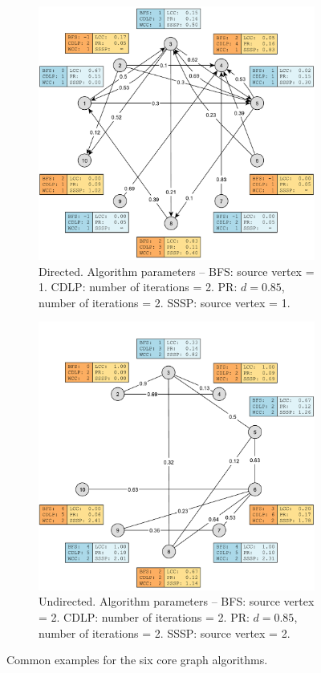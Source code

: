\begin{figure}[h]
	\centering
	\begin{subfigure}{\textwidth}
		\centering
		\includegraphics[scale=\examplescale]{figures/examples/common-dir.pdf}
		\caption{Directed. Algorithm parameters --
			BFS: source vertex = 1.
			CDLP: number of iterations = 2.
			PR: $d = 0.85$, number of iterations = 2.
			SSSP: source vertex = 1.}
	\end{subfigure}
	\begin{subfigure}{\textwidth}
		\centering
		\includegraphics[scale=\examplescale]{figures/examples/common-undir.pdf}
		\caption{Undirected. Algorithm parameters --
			BFS: source vertex = 2.
			CDLP: number of iterations = 2.
			PR: $d = 0.85$, number of iterations = 2.
			SSSP: source vertex = 2.}
	\end{subfigure}
	\caption{Common examples for the six core graph algorithms.}
	\label{fig:common_example}
\end{figure}

